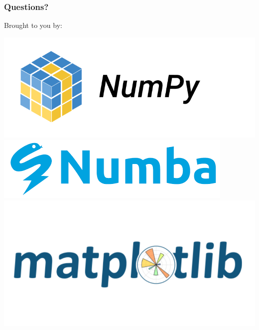 \documentclass[aspectratio=169]{beamer}
\begin{document}
\begin{frame}
\frametitle{Questions?}

Brought to you by:

\centering\includegraphics[width=0.3\paperwidth]{presentation/numpy.png} \includegraphics[width=0.3\paperwidth]{presentation/numba.png}
\includegraphics[width=0.3\paperwidth]{presentation/tutorial_matplotlib.png}

\end{frame}
\end{document}
